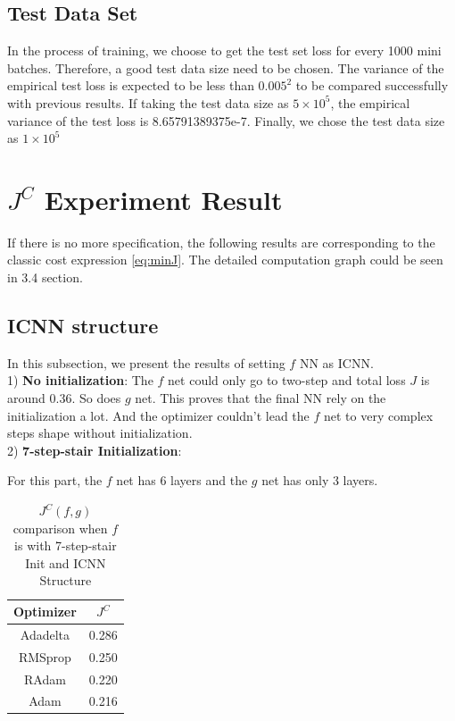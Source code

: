 \documentclass[conference,compsoc]{IEEEtran}
\begin{document}
\subsection{Test Data Set}
In the process of training, we choose to get the test set loss for every 1000 mini batches. Therefore, a good test data size need to be chosen. The variance of the empirical test loss is expected to be less than $0.005^2$ to be compared successfully with previous results. If taking the test data size as $5\times10^5$, the empirical variance of the test loss is 8.65791389375e-7. Finally, we chose the test data size as $1\times10^5$

\section{$J^C$ Experiment Result}
If there is no more specification, the following results are corresponding to the classic cost expression \eqref{eq:minJ}. The detailed computation graph could be seen in 3.4 section.
\subsection{ICNN structure}
In this subsection, we present the results of setting $f$ NN as ICNN. \\

1) \textbf{No initialization}:
The $f$ net could only go to two-step and total loss $J$ is around 0.36. So does $g$ net. This proves that the final NN rely on the initialization a lot. And the optimizer couldn't lead the $f$ net to very complex steps shape without initialization.\\

2) \textbf{7-step-stair Initialization}:

For this part, the $f$ net has 6 layers  and the $g$ net has only 3 layers. 
\begin{table}[htbp]
  \caption{$J^{C}(f,g)$ comparison when $f$ is with 7-step-stair Init and ICNN Structure }
  \begin{center}
  \begin{tabular}{|c|c|}
  \hline
  \textbf{Optimizer}& $J^{C}$ \\
  \hline

  Adadelta & 0.286\\
  RMSprop& 0.250 \\
  RAdam & 0.220\\
  Adam & 0.216\\
  \hline

\end{tabular}
  \label{tab1e results}
  \end{center}
  \end{table}
  
\end{document}
